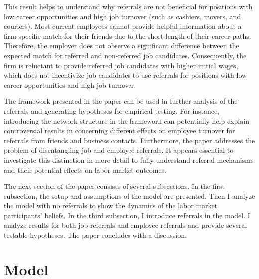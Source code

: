 \documentclass[12pt]{article}
\begin{document}
This result helps to understand why referrals are not beneficial for positions with low career opportunities and high job turnover (such as cashiers, movers, and couriers). Most current employees cannot provide helpful information about a firm-specific match for their friends due to the short length of their career paths.  Therefore, the employer does not observe a significant difference between the expected match for referred and non-referred job candidates. Consequently, the firm is reluctant to provide referred job candidates with higher initial wages, which does not incentivize job candidates to use referrals for positions with low career opportunities and high job turnover.

The framework presented in the paper can be used in further analysis of the referrals and generating hypotheses for empirical testing. For instance, introducing the network structure in the framework can potentially help explain controversial results in \cite{lester2021heterogeneous} concerning different effects on employee turnover for referrals from friends and business contacts. Furthermore, the paper addresses the problem of disentangling job and employee referrals. It appears essential to investigate this distinction in more detail to fully understand referral mechanisms and their potential effects on labor market outcomes.

The next section of the paper consists of several subsections. In the first subsection, the setup and assumptions of the model are presented. Then I analyze the model with no referrals to show the dynamics of the labor market participants' beliefs. In the third subsection, I introduce referrals in the model. I analyze results for both job referrals and employee referrals and provide several testable hypotheses. The paper concludes with a discussion.


\section{Model} \label{sec:model}
\end{document}
